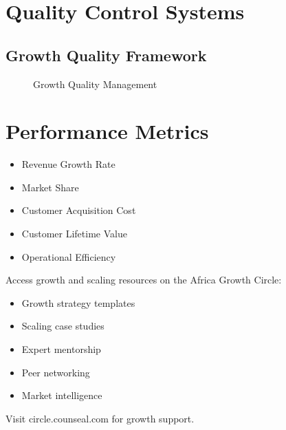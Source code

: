 \FloatBarrier
\section{Quality Control Systems}

\subsection{Growth Quality Framework}
\begin{figure}[htbp]
    \centering
    \caption{Growth Quality Management}
    \label{fig:quality-management}
\end{figure}

\section{Performance Metrics}

\begin{tcolorbox}[colback=white,colframe=primarydark,title=\textbf{Growth KPIs}]
\begin{itemize}
    \item Revenue Growth Rate
    \item Market Share
    \item Customer Acquisition Cost
    \item Customer Lifetime Value
    \item Operational Efficiency
\end{itemize}
\end{tcolorbox}

\begin{communitybox}
Access growth and scaling resources on the Africa Growth Circle:
\begin{itemize}
    \item Growth strategy templates
    \item Scaling case studies
    \item Expert mentorship
    \item Peer networking
    \item Market intelligence
\end{itemize}
Visit circle.counseal.com for growth support.
\end{communitybox}

